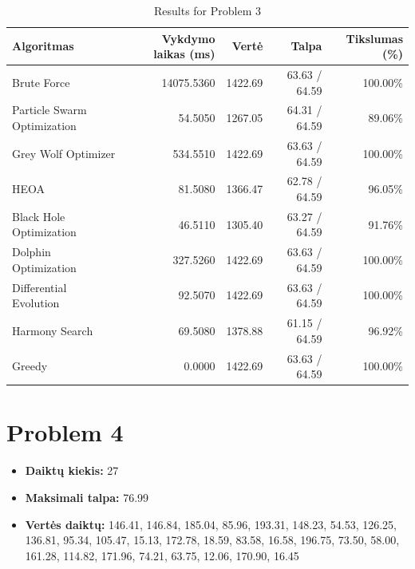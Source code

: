 \documentclass[a4paper,11pt]{article}
\begin{document}
\begin{table}[h!]
\centering
\begin{tabular}{lrrrr}
\toprule
\textbf{Algoritmas} & \textbf{Vykdymo laikas (ms)} & \textbf{Vertė} & \textbf{Talpa} & \textbf{Tikslumas (\%)} \\
\midrule
Brute Force & 14075.5360 & 1422.69 & 63.63 / 64.59 & 100.00\% \\
Particle Swarm Optimization & 54.5050 & 1267.05 & 64.31 / 64.59 & 89.06\% \\
Grey Wolf Optimizer & 534.5510 & 1422.69 & 63.63 / 64.59 & 100.00\% \\
HEOA & 81.5080 & 1366.47 & 62.78 / 64.59 & 96.05\% \\
Black Hole Optimization & 46.5110 & 1305.40 & 63.27 / 64.59 & 91.76\% \\
Dolphin Optimization & 327.5260 & 1422.69 & 63.63 / 64.59 & 100.00\% \\
Differential Evolution & 92.5070 & 1422.69 & 63.63 / 64.59 & 100.00\% \\
Harmony Search & 69.5080 & 1378.88 & 61.15 / 64.59 & 96.92\% \\
Greedy & 0.0000 & 1422.69 & 63.63 / 64.59 & 100.00\% \\
\bottomrule
\end{tabular}
\caption{Results for Problem 3}
\end{table}
\clearpage

\section*{Problem 4}
\begin{itemize}
    \item \textbf{Daiktų kiekis:} 27
    \item \textbf{Maksimali talpa:} 76.99
    \item \textbf{Vertės daiktų:} 146.41, 146.84, 185.04, 85.96, 193.31, 148.23, 54.53, 126.25, 136.81, 95.34, 105.47, 15.13, 172.78, 18.59, 83.58, 16.58, 196.75, 73.50, 58.00, 161.28, 114.82, 171.96, 74.21, 63.75, 12.06, 170.90, 16.45
\end{itemize}
\end{document}
